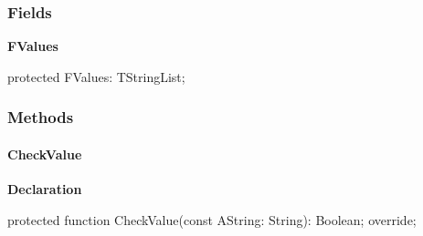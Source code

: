 \documentclass{report}
\newif\ifpdf
\begin{document}
\subsubsection*{\large{\textbf{Fields}}\normalsize\hspace{1ex}\hfill}
\begin{list}{}{
\setlength{\itemindent}{0cm}
\setlength{\listparindent}{0cm}
\setlength{\leftmargin}{\evensidemargin}
\addtolength{\leftmargin}{\tmplength}
\settowidth{\labelsep}{X}
\addtolength{\leftmargin}{\labelsep}
\setlength{\labelwidth}{\tmplength}
}
\label{PasDoc_OptionParser.TStringOptionList-FValues}
\item[\textbf{FValues}\hfill]
\ifpdf
\begin{flushleft}
\fi
\begin{ttfamily}
protected FValues: TStringList;\end{ttfamily}

\ifpdf
\end{flushleft}
\fi


\par  \end{list}
\subsubsection*{\large{\textbf{Methods}}\normalsize\hspace{1ex}\hfill}
\paragraph*{CheckValue}\hspace*{\fill}

\label{PasDoc_OptionParser.TStringOptionList-CheckValue}
\begin{list}{}{
\setlength{\itemindent}{0cm}
\setlength{\listparindent}{0cm}
\setlength{\leftmargin}{\evensidemargin}
\addtolength{\leftmargin}{\tmplength}
\settowidth{\labelsep}{X}
\addtolength{\leftmargin}{\labelsep}
\setlength{\labelwidth}{\tmplength}
}
\item[\textbf{Declaration}\hfill]
\ifpdf
\begin{flushleft}
\fi
\begin{ttfamily}
protected function CheckValue(const AString: String): Boolean; override;\end{ttfamily}

\ifpdf
\end{flushleft}
\fi

\end{list}
\end{document}
